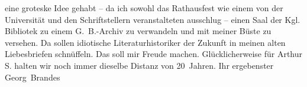 \begin{ledgroupsized}[t]{13cm}
{{{                        eine groteske Idee gehabt}}}\label{K_L02051_1h} – da ich sowohl das Rathausfest wie einem
                    von der Universität und den Schriftstellern veranstalteten ausschlug – einen
                    Saal der Kgl. Bibliotek zu einem G. B.-Archiv zu verwandeln und mit meiner Büste
                    zu versehen.\pend
           \pstart
           Da sollen idiotische Literaturhistoriker der Zukunft in meinen alten
                    Liebesbriefen schnüffeln. Das soll mir Freude machen.\pend
           \pstart
           Glücklicherweise für Arthur S. halten wir noch immer dieselbe Distanz von
                    20 Jahren.\pend
           \pstart Ihr ergebenster \spacefill\mbox{Georg Brandes}\pend{}\endnumbering{}\end{ledgroupsized}  \newcommand{\dateiname}{L02051}\newcommand{\titel}{Georg Brandes an Arthur und Olga Schnitzler, 3. 2. 1912}\newcommand{\editorInnen}{Martin Anton Müller und Gerd-Hermann Susen}
      